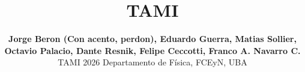 \setlength{\droptitle}{-100pt}

\title{
    \textbf{
        TAMI
    }
}

\author{
\textbf{
  Jorge Beron (Con acento, perdon),
  Eduardo Guerra,
  Matias Sollier,} \\
  \textbf{
  Octavio Palacio,
  Dante Resnik,
  Felipe Ceccotti,
  Franco A. Navarro C. }\\
  \footnotesize
  TAMI 2026
  \footnotesize
  Departamento de Física, FCEyN, UBA
}

\date{}
